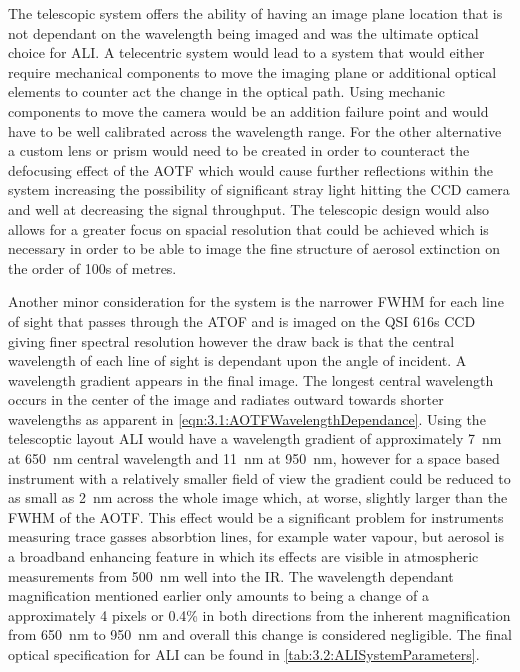 \documentclass[12pt]{article}
\begin{document}
The telescopic system offers the ability of having an image plane location that is not dependant on the wavelength being imaged and was the ultimate optical choice for ALI. A telecentric system would lead to a system that would either require mechanical components to move the imaging plane or additional optical elements to counter act the change in the optical path. Using mechanic components to move the camera would be an addition failure point and would have to be well calibrated across the wavelength range. For the other alternative a custom lens or prism would need to be created in order to counteract the defocusing effect of the AOTF which would cause further reflections within the system increasing the possibility of significant stray light hitting the CCD camera and well at decreasing the signal throughput. The telescopic design would also allows for a greater focus on spacial resolution that could be achieved which is necessary in order to be able to image the fine structure of aerosol extinction on the order of 100s of metres.

Another minor consideration for the system is the narrower FWHM for each line of sight that passes through the ATOF and is imaged on the QSI 616s CCD giving finer spectral resolution however the draw back is that the central wavelength of each line of sight is dependant upon the angle of incident. A wavelength gradient appears in the final image. The longest central wavelength occurs in the center of the image and radiates outward towards shorter wavelengths as apparent in \autoref{eqn:3.1:AOTFWavelengthDependance}. Using the telescoptic layout ALI would have a wavelength gradient of approximately 7~nm at 650~nm central wavelength and 11~nm at 950~nm, however for a space based instrument with a relatively smaller field of view the gradient could be reduced to as small as 2~nm across the whole image which, at worse, slightly larger than the FWHM of the AOTF. This effect would be a significant problem for instruments measuring trace gasses absorbtion lines, for example water vapour, but aerosol is a broadband enhancing feature in which its effects are visible in atmospheric measurements from 500~nm well into the IR. The wavelength dependant magnification mentioned earlier only amounts to being a change of a approximately 4 pixels or 0.4\% in both directions from the inherent magnification from 650~nm to 950~nm and overall this change is considered negligible. The final optical specification for ALI can be found in \autoref{tab:3.2:ALISystemParameters}.
\end{document}
